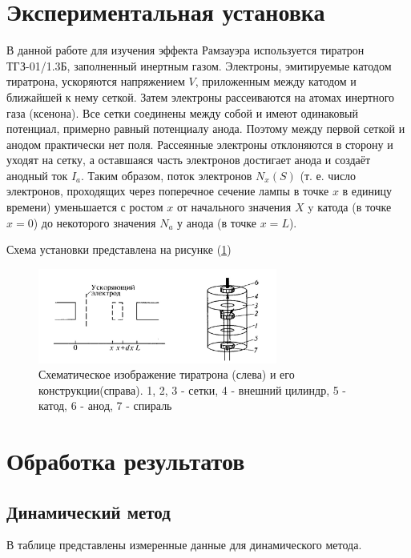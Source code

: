 \documentclass[a4paper, 12pt]{article}
\begin{document}
\section{Экспериментальная установка}
В данной работе для изучения эффекта Рамзауэра используется
тиратрон ТГЗ-01/1.3Б, заполненный инертным газом. Электроны, эмитируемые катодом тиратрона, ускоряются напряжением $V$, приложенным между катодом и ближайшей к нему сеткой. 
Затем электроны рассеиваются на атомах инертного газа (ксенона). Все сетки соединены между собой и имеют одинаковый потенциал, примерно равный потенциалу анода. 
Поэтому между первой сеткой и анодом практически нет поля. Рассеянные электроны отклоняются в сторону и уходят на сетку, а оставшаяся часть электронов достигает анода и создаёт анодный ток $I_a$.
Таким образом, поток электронов $N_x(S)$ (т. е. число электронов, проходящих через поперечное сечение лампы в точке $x$ в единицу времени) уменьшается с ростом $x$ от 
начального значения $X$ y катода (в точке $x = 0$) до некоторого значения $N_a$ у анода (в точке $x = L$).\

Схема установки представлена на рисунке (\ref{fig:set})

\begin{figure}[H]
    \centering
    \includegraphics[width=0.7\textwidth]{set.jpg}
    \caption{Схематическое изображение тиратрона (слева) и его конструкции(справа). 1, 2, 3 - сетки, 4 - внешний цилиндр, 5 - катод, 6 - анод, 7 - спираль}
    \label{fig:set}
\end{figure}


\section{Обработка результатов}
\subsection*{Динамический метод}
В таблице представлены измеренные данные для динамического метода.
\end{document}
